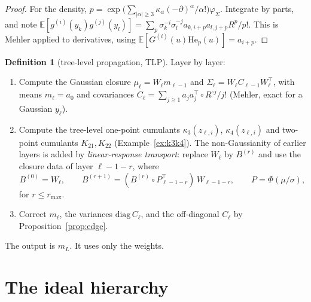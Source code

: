 \documentclass[11pt]{article}
\theoremstyle{definition}
\newtheorem{definition}[theorem]{Definition}
\theoremstyle{remark}
\newcommand{\E}{\mathbb E}
\newcommand{\He}{\mathrm{He}}
\begin{document}
\begin{proof}
For the density, $p=\exp\big(\sum_{|\alpha|\ge3}\kappa_\alpha(-\partial)^\alpha/\alpha!\big)\varphi_\Sigma$. Integrate by parts, and note $\E[g^{(i)}(y_k)g^{(j)}(y_l)]=\sum_p\sigma_k^{-i}\sigma_l^{-j}a_{k,i+p}a_{l,j+p}R^p/p!$. This is Mehler applied to derivatives, using $\E[G^{(i)}(u)\He_p(u)]=a_{i+p}$.
\end{proof}

\begin{definition}[tree-level propagation, TLP]\label{def:tlp}
Layer by layer:
\begin{enumerate}
\item Compute the Gaussian closure $\mu_\ell=W_\ell m_{\ell-1}$ and $\Sigma_\ell=W_\ell C_{\ell-1}W_\ell^\top$, with means $m_\ell=a_0$ and covariances $C_\ell=\sum_{j\ge1}a_ja_j^\top\circ R^{\circ j}/j!$ (Mehler, exact for a Gaussian $y_\ell$).
\item Compute the tree-level one-point cumulants $\kappa_3(z_{\ell,i})$, $\kappa_4(z_{\ell,i})$ and two-point cumulants $K_{21},K_{22}$ (Example~\ref{ex:k3k4}). The non-Gaussianity of earlier layers is added by \emph{linear-response transport}: replace $W_\ell$ by $B^{(r)}$ and use the closure data of layer $\ell-1-r$, where
\[
B^{(0)}=W_\ell,\qquad B^{(r+1)}=(B^{(r)}\circ P_{\ell-1-r}^\top)\,W_{\ell-1-r},\qquad P=\Phi(\mu/\sigma),
\]
for $r\le r_{\max}$.
\item Correct $m_\ell$, the variances $\mathrm{diag}\,C_\ell$, and the off-diagonal $C_\ell$ by Proposition~\ref{prop:edge}.
\end{enumerate}
The output is $m_L$. It uses only the weights.
\end{definition}

\section{The ideal hierarchy}\label{sec:ideal}
\end{document}
